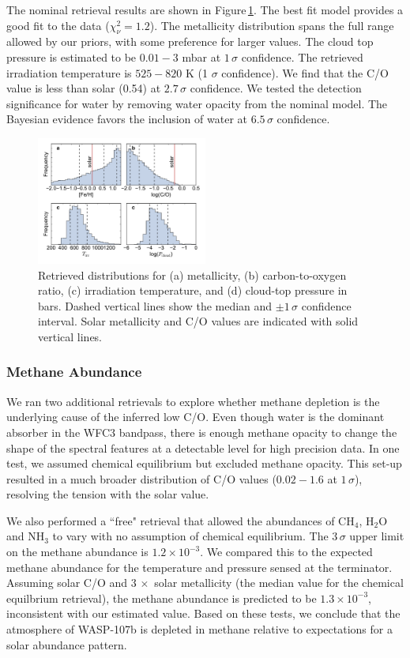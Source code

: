 \documentclass[twocolumn]{aastex61}
\begin{document}
The nominal retrieval results are shown in Figure\,\ref{fig:retrieval}.  The best fit model provides a good fit to the data ($\chi^2_\nu = 1.2$).  The metallicity distribution spans the full range allowed by our priors, with some preference for larger values. The cloud top pressure is estimated to be $0.01 - 3$ mbar at $1\,\sigma$ confidence. The retrieved irradiation temperature is $525 - 820$ K (1 $\sigma$ confidence).  We find that the C/O value is less than solar (0.54) at $2.7\,\sigma$ confidence.  We tested the detection significance for water by removing water opacity from the nominal model. The Bayesian evidence favors the inclusion of water at $6.5\,\sigma$ confidence. 

\begin{figure}
\includegraphics[width = 0.5\textwidth]{Figures/retrieval.pdf}
\caption{Retrieved distributions for (a) metallicity, (b) carbon-to-oxygen ratio, (c) irradiation temperature, and (d) cloud-top pressure in bars. Dashed vertical lines show the median and $\pm1\,\sigma$ confidence interval. Solar metallicity and C/O values are indicated with solid vertical lines.}  \label{fig:retrieval}
\end{figure}

\subsubsection{Methane Abundance}
We ran two additional retrievals to explore whether methane depletion is the underlying cause of the inferred low C/O.  Even though water is the dominant absorber in the WFC3 bandpass, there is enough methane opacity to change the shape of the spectral features at a detectable level for high precision data.  In one test, we assumed chemical equilibrium but excluded methane opacity. This set-up resulted in a much broader distribution of C/O values ($0.02 - 1.6$ at $1\,\sigma$), resolving the tension with the solar value. 

We also performed a ``free" retrieval that allowed the abundances of CH$_4$, H$_2$O and NH$_3$ to vary with no assumption of chemical equilibrium. The $3\,\sigma$ upper limit on the methane abundance is $1.2\times10^{-3}$. We compared this to the expected methane abundance for the temperature and pressure sensed at the terminator.  Assuming  solar C/O and $3\,\times$ solar metallicity (the median value for the chemical equilbrium retrieval), the methane abundance is predicted to be $1.3\times10^{-3}$, inconsistent with our estimated value.  Based on these tests, we conclude that the atmosphere of WASP-107b is depleted in methane relative to expectations for a solar abundance pattern.
\end{document}
